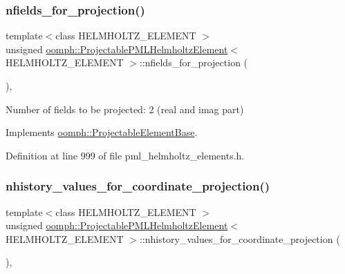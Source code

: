 \subsubsection{\texorpdfstring{nfields\+\_\+for\+\_\+projection()}{nfields\_for\_projection()}}
{\footnotesize\ttfamily template$<$class H\+E\+L\+M\+H\+O\+L\+T\+Z\+\_\+\+E\+L\+E\+M\+E\+NT $>$ \\
unsigned \hyperlink{classoomph_1_1ProjectablePMLHelmholtzElement}{oomph\+::\+Projectable\+P\+M\+L\+Helmholtz\+Element}$<$ H\+E\+L\+M\+H\+O\+L\+T\+Z\+\_\+\+E\+L\+E\+M\+E\+NT $>$\+::nfields\+\_\+for\+\_\+projection (\begin{DoxyParamCaption}{ }\end{DoxyParamCaption})\hspace{0.3cm}{\ttfamily [inline]}, {\ttfamily [virtual]}}



Number of fields to be projected\+: 2 (real and imag part) 



Implements \hyperlink{classoomph_1_1ProjectableElementBase_a44634aa4049332a580d249c25564638c}{oomph\+::\+Projectable\+Element\+Base}.



Definition at line 999 of file pml\+\_\+helmholtz\+\_\+elements.\+h.

\mbox{\label{classoomph_1_1ProjectablePMLHelmholtzElement_a3af221fe8b94d8a50917c92c3cc94b5d}} 
\subsubsection{\texorpdfstring{nhistory\+\_\+values\+\_\+for\+\_\+coordinate\+\_\+projection()}{nhistory\_values\_for\_coordinate\_projection()}}
{\footnotesize\ttfamily template$<$class H\+E\+L\+M\+H\+O\+L\+T\+Z\+\_\+\+E\+L\+E\+M\+E\+NT $>$ \\
unsigned \hyperlink{classoomph_1_1ProjectablePMLHelmholtzElement}{oomph\+::\+Projectable\+P\+M\+L\+Helmholtz\+Element}$<$ H\+E\+L\+M\+H\+O\+L\+T\+Z\+\_\+\+E\+L\+E\+M\+E\+NT $>$\+::nhistory\+\_\+values\+\_\+for\+\_\+coordinate\+\_\+projection (\begin{DoxyParamCaption}{ }\end{DoxyParamCaption})\hspace{0.3cm}{\ttfamily [inline]}, {\ttfamily [virtual]}}



